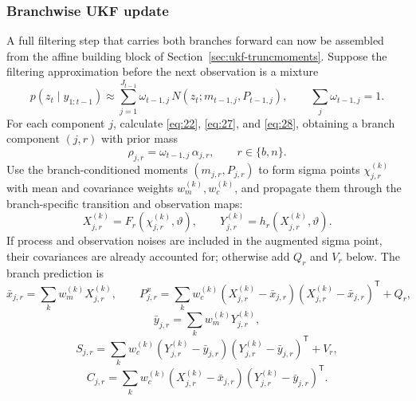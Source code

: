 \documentclass[11pt]{article}
\begin{document}
\subsubsection{Branchwise UKF update}
\label{sec:ukf-branchwise}

A full filtering step that carries both branches forward can now be
assembled from the affine building block of
Section~\ref{sec:ukf-truncmoments}. Suppose the filtering approximation before the next
observation is a mixture
\begin{equation}\label{eq:36}
 p(z_t\mid y_{1:t-1})
 \approx\sum_{j=1}^{J_{t-1}}\omega_{t-1,j}\,
 N(z_t;m_{t-1,j},P_{t-1,j}),
 \qquad \sum_j\omega_{t-1,j}=1.
\end{equation}
For each component $j$, calculate \eqref{eq:22}, \eqref{eq:27}, and
\eqref{eq:28}, obtaining a branch component $(j,r)$ with prior mass
\begin{equation}\label{eq:37}
 \rho_{j,r}=\omega_{t-1,j}\,\alpha_{j,r},
 \qquad r\in\{b,n\}.
\end{equation}
Use the branch-conditioned moments $(m_{j,r},P_{j,r})$ to form sigma points
$\chi_{j,r}^{(k)}$ with mean and covariance weights $w_m^{(k)},w_c^{(k)}$,
and propagate them through the branch-specific transition and observation
maps:
\begin{equation}\label{eq:38}
 X_{j,r}^{(k)}=F_r(\chi_{j,r}^{(k)},\vartheta),
 \qquad
 Y_{j,r}^{(k)}=h_r(X_{j,r}^{(k)},\vartheta).
\end{equation}
If process and observation noises are included in the augmented sigma point,
their covariances are already accounted for; otherwise add $Q_r$ and $V_r$
below. The branch prediction is
\begin{equation}\label{eq:39}
 \bar x_{j,r}=\sum_k w_m^{(k)}X_{j,r}^{(k)},
 \qquad
 P^x_{j,r}=\sum_k w_c^{(k)}
 (X_{j,r}^{(k)}-\bar x_{j,r})(X_{j,r}^{(k)}-\bar x_{j,r})^{\mathsf T}+Q_r,
\end{equation}
\begin{equation}\label{eq:40}
 \bar y_{j,r}=\sum_k w_m^{(k)}Y_{j,r}^{(k)},
\end{equation}
\begin{equation}\label{eq:41}
 S_{j,r}=\sum_k w_c^{(k)}
 (Y_{j,r}^{(k)}-\bar y_{j,r})(Y_{j,r}^{(k)}-\bar y_{j,r})^{\mathsf T}+V_r,
\end{equation}
\begin{equation}\label{eq:42}
 C_{j,r}=\sum_k w_c^{(k)}
 (X_{j,r}^{(k)}-\bar x_{j,r})(Y_{j,r}^{(k)}-\bar y_{j,r})^{\mathsf T}.
\end{equation}
\end{document}
